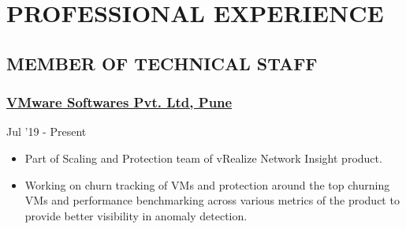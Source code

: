 \documentclass[letterpaper]{twentysecondcv} %
\begin{document}




\makeprofile %



\section{PROFESSIONAL EXPERIENCE}
\subsection{MEMBER OF TECHNICAL STAFF}\subsubsection{\href{https://www.vmware.com/in.html}{VMware Softwares Pvt. Ltd, Pune}}  \hfill{} Jul '19 - Present
\begin{itemize}
    \item Part of Scaling and Protection team of vRealize Network Insight product. 
    \item Working on churn tracking of VMs and protection around the top churning VMs and performance benchmarking across various metrics of the product to provide better visibility in anomaly detection.
\end{itemize}
\end{document}
